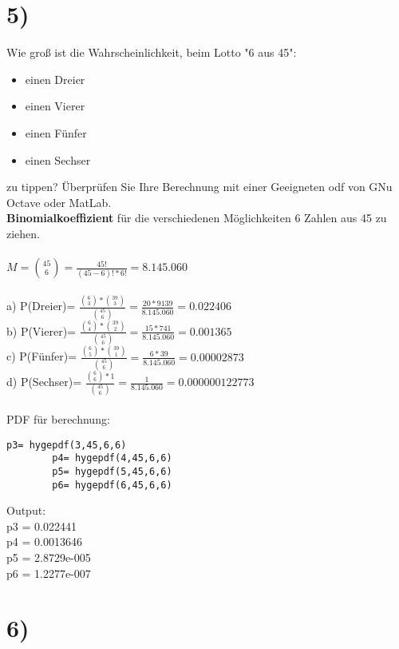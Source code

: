 \documentclass[11pt,a4paper]{article}
\begin{document}
	\section*{5)}
	Wie groß ist die Wahrscheinlichkeit, beim Lotto "6 aus 45":
	\begin{itemize}
		\item einen Dreier
		\item einen Vierer
		\item einen Fünfer
		\item einen Sechser
	\end{itemize}
	zu tippen? Überprüfen Sie Ihre Berechnung mit einer Geeigneten odf von GNu Octave oder MatLab.\\

	\textbf{Binomialkoeffizient} für die verschiedenen Möglichkeiten 6 Zahlen aus 45 zu ziehen.\\\\
	\(M=\binom{45}{6} =\frac{45!}{(45-6)! * 6!}= 8.145.060\)\\\\
	a) P(Dreier)= \( \frac{\binom{6}{3} * \binom{39}{3}}{\binom{45}{6}}=\frac{20*9139}{8.145.060}=0.022406\)\\
	b) P(Vierer)= \( \frac{\binom{6}{4} * \binom{39}{2}}{\binom{45}{6}}=\frac{15*741}{8.145.060}=0.001365\)\\
	c) P(Fünfer)= \( \frac{\binom{6}{5} * \binom{39}{1}}{\binom{45}{6}}=\frac{6*39}{8.145.060}=0.00002873\)\\
	d) P(Sechser)= \( \frac{\binom{6}{6} * 1}{\binom{45}{6}}=\frac{1}{8.145.060}=0.000000122773\)\\\\
	PDF für berechnung:\\
	\begin{lstlisting}[frame=single]
		p3= hygepdf(3,45,6,6)
		p4= hygepdf(4,45,6,6)
		p5= hygepdf(5,45,6,6)
		p6= hygepdf(6,45,6,6)
	\end{lstlisting}
	Output:\\
	p3 =  0.022441\\
	p4 =  0.0013646\\
	p5 =   2.8729e-005\\
	p6 =   1.2277e-007\\

	\section*{6)}
\end{document}
